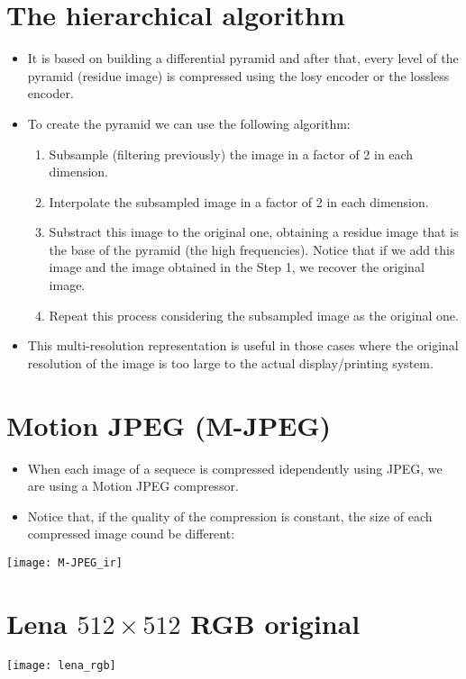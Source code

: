 \section{The hierarchical algorithm}
\begin{itemize}
\item It is based on building a differential pyramid and after that,
  every level of the pyramid (residue image) is compressed using the
  losy encoder or the lossless encoder.
\item To create the pyramid we can use the following algorithm:
  \begin{enumerate}
  \item Subsample (filtering previously) the image in a factor of 2 in
    each dimension.
  \item Interpolate the subsampled image in a factor of 2 in each
    dimension.
  \item Substract this image to the original one, obtaining a residue
    image that is the base of the pyramid (the high
    frequencies). Notice that if we add this image and the image
    obtained in the Step 1, we recover the original image.
  \item Repeat this process considering the subsampled image as the
    original one.
  \end{enumerate}
\item This multi-resolution representation is useful in those cases
  where the original resolution of the image is too large to the
  actual display/printing system.
\end{itemize}

\section{Motion JPEG (M-JPEG)}
\begin{itemize}
\item When each image of a sequece is compressed idependently using
  JPEG, we are using a Motion JPEG compressor.
\item Notice that, if the quality of the compression is constant, the size of each compressed image cound be different:
\end{itemize}
\begin{center}
  \texttt{[image: M-JPEG\_ir]}
\end{center}

\section*{Lena $512\times 512$ RGB original}
\begin{center}
  \texttt{[image: lena\_rgb]}
\end{center}

